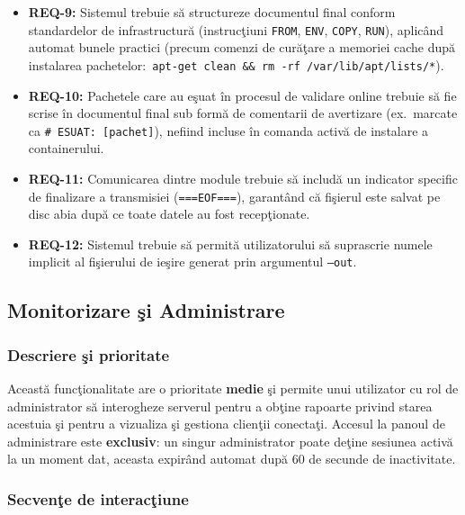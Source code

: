 \documentclass[12pt, a4paper]{article}
\begin{document}
\begin{itemize}
    \item \textbf{REQ-9:} Sistemul trebuie s\u{a} structureze documentul final conform standardelor de
    infrastructur\u{a} (instruc\c{t}iuni \texttt{FROM}, \texttt{ENV}, \texttt{COPY}, \texttt{RUN}), aplic\^{a}nd automat
    bunele practici (precum comenzi de cur\u{a}\c{t}are a memoriei cache dup\u{a} instalarea pachetelor:\
    \texttt{apt-get clean \&\& rm -rf /var/lib/apt/lists/*}).
    \item \textbf{REQ-10:} Pachetele care au e\c{s}uat \^{i}n procesul de validare online trebuie s\u{a} fie scrise
    \^{i}n documentul final sub form\u{a} de comentarii de avertizare (ex.\ marcate ca \texttt{\# ESUAT:
    [pachet]}), nefiind incluse \^{i}n comanda activ\u{a} de instalare a containerului.
    \item \textbf{REQ-11:} Comunicarea dintre module trebuie s\u{a} includ\u{a} un indicator specific de
    finalizare a transmisiei (\texttt{===EOF===}), garantând c\u{a} fi\c{s}ierul este salvat pe disc abia dup\u{a} ce
    toate datele au fost recep\c{t}ionate.
    \item \textbf{REQ-12:} Sistemul trebuie s\u{a} permit\u{a} utilizatorului s\u{a} suprascrie numele implicit
    al fi\c{s}ierului de ie\c{s}ire generat prin argumentul \texttt{--out}.
\end{itemize}

\subsection{Monitorizare \c{s}i Administrare}

\subsubsection{Descriere \c{s}i prioritate}

Aceast\u{a} func\c{t}ionalitate are o prioritate \textbf{medie} \c{s}i permite unui utilizator cu rol de administrator
s\u{a} interogheze serverul pentru a ob\c{t}ine rapoarte privind starea acestuia \c{s}i pentru a vizualiza \c{s}i gestiona
clien\c{t}ii conecta\c{t}i. Accesul la panoul de administrare este \textbf{exclusiv}: un singur administrator poate
de\c{t}ine sesiunea activ\u{a} la un moment dat, aceasta expir\^{a}nd automat dup\u{a} 60 de secunde de inactivitate.

\subsubsection{Secven\c{t}e de interac\c{t}iune}
\end{document}
